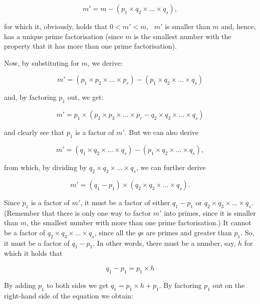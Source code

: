 \documentclass{scrreprt}
\begin{document}
\begin{equation}
m' = m - (p_1 \times q_2 \times \dots \times q_s),
\end{equation}

for which it, obviously, holds that $0 < m' < m$,
\ie\ $m'$ is 
smaller than $m$ and, hence, has a unique
prime factorisation (since $m$ is the smallest number
with the property that it has more than one
prime factorisation).

Now, by substituting for $m$, we derive:

\begin{equation}
m' = (p_1 \times p_2 \times \dots \times p_r) - 
     (p_1 \times q_2 \times \dots \times q_s) 
\end{equation}

and, by factoring $p_1$ out, we get:

\begin{equation}
m' = p_1 \times (p_2 \times p_3 \times \dots \times p_r -
                 q_2 \times q_3 \times \dots \times q_s)
\end{equation}

and clearly see that $p_1$ is a factor of $m'$.
But we can also derive 

\begin{equation}
m' = (q_1 \times q_2 \times \dots \times q_s) - 
     (p_1 \times q_2 \times \dots \times q_s), 
\end{equation}

from which, by dividing by $q_2 \times q_3 \times \dots \times q_s$,
we can further derive

\begin{equation}
m' = (q_1 - p_1) \times (q_2 \times q_3 \times \dots \times q_s).
\end{equation}

Since $p_1$ is a factor of $m'$, it must be a factor of
either $q_1 - p_1$ or $q_2 \times q_3 \times \dots \times q_s$.
(Remember that there is only one way to factor $m'$ into primes,
since it is smaller than $m$, the smallest number 
with more than one prime factorisation.)
It cannot be a factor of $q_2 \times q_3 \times \dots \times q_s$,
since all the $q$s are primes and greater than $p_1$.
So, it must be a factor of $q_1 - p_1$.
In other words, there must be a number, say, $h$ for which
it holds that

\begin{equation}
q_1 - p_1 = p_1 \times h
\end{equation}

By adding $p_1$ to both sides we get $q_1 = p_1 \times h + p_1$.
By factoring $p_1$ out on the right-hand side of the equation
we obtain:
\end{document}
